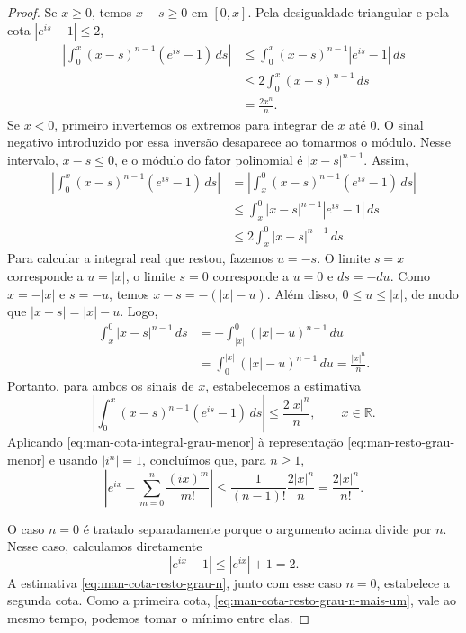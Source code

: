 \documentclass[12pt,portuguese]{article}
\theoremstyle{definition}
\theoremstyle{plainexercise}
\theoremstyle{starredexercise}
\theoremstyle{definition}
\begin{document}
\begin{proof}
Se $x\geqslant0$, temos $x-s\geqslant0$ em $[0,x]$. Pela
desigualdade triangular e pela cota $|e^{is}-1|\leqslant2$,
\begin{align*}
\left|\int_0^x(x-s)^{n-1}(e^{is}-1)\,ds\right|
&\leqslant\int_0^x(x-s)^{n-1}|e^{is}-1|\,ds
\\[0.3cm]
&\leqslant2\int_0^x(x-s)^{n-1}\,ds
\\[0.3cm]
&=\frac{2x^n}{n}.
\end{align*}
Se $x<0$, primeiro invertemos os extremos para integrar de $x$ até
$0$. O sinal negativo introduzido por essa inversão desaparece ao
tomarmos o módulo. Nesse intervalo, $x-s\leqslant0$, e o módulo
do fator polinomial é $\left|x-s\right|^{n-1}$. Assim,
\begin{align*}
\left|\int_0^x(x-s)^{n-1}(e^{is}-1)\,ds\right|
&=\left|\int_x^0(x-s)^{n-1}(e^{is}-1)\,ds\right|
\\[0.3cm]
&\leqslant\int_x^0|x-s|^{n-1}|e^{is}-1|\,ds
\\[0.3cm]
&\leqslant2\int_x^0|x-s|^{n-1}\,ds.
\end{align*}
Para calcular a integral real que restou, fazemos $u=-s$.
O limite $s=x$ corresponde a $u=|x|$, o limite $s=0$ corresponde
a $u=0$ e $ds=-du$. Como $x=-|x|$ e $s=-u$, temos
$x-s=-(|x|-u)$. Além disso, $0\leqslant u\leqslant|x|$,
de modo que $\left|x-s\right|=|x|-u$. Logo,
\begin{align*}
\int_x^0|x-s|^{n-1}\,ds
&=-\int_{|x|}^0(|x|-u)^{n-1}\,du
\\[0.3cm]
&=\int_0^{|x|}(|x|-u)^{n-1}\,du
=\frac{|x|^n}{n}.
\end{align*}
Portanto, para ambos os sinais de $x$, estabelecemos a estimativa
\begin{equation}\label{eq:man-cota-integral-grau-menor}
\left|\int_0^x(x-s)^{n-1}(e^{is}-1)\,ds\right|
\leqslant\frac{2|x|^n}{n},
\qquad x\in\mathbb{R}.
\end{equation}
Aplicando \eqref{eq:man-cota-integral-grau-menor} à representação
\eqref{eq:man-resto-grau-menor} e usando $|i^n|=1$, concluímos que,
para $n\geqslant1$,
\begin{equation}\label{eq:man-cota-resto-grau-n}
\left|e^{ix}-\sum_{m=0}^n\frac{(ix)^m}{m!}\right|
\leqslant\frac{1}{(n-1)!}\frac{2|x|^n}{n}
=\frac{2|x|^n}{n!}.
\end{equation}

O caso $n=0$ é tratado separadamente porque o argumento acima
divide por $n$. Nesse caso, calculamos diretamente
\[
|e^{ix}-1|\leqslant|e^{ix}|+1=2.
\]
A estimativa \eqref{eq:man-cota-resto-grau-n}, junto com esse caso
$n=0$, estabelece a segunda cota. Como a primeira cota,
\eqref{eq:man-cota-resto-grau-n-mais-um}, vale ao mesmo tempo,
podemos tomar o mínimo entre elas.
\end{proof}
\end{document}
